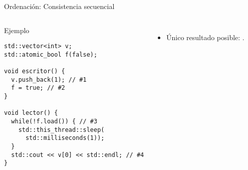 \begin{frame}[fragile]{Ordenación: Consistencia secuencial}
\begin{columns}[T]


\begin{block}{Ejemplo}
\begin{lstlisting}
std::vector<int> v; 
std::atomic_bool f(false); 

void escritor() { 
  v.push_back(1); // #1
  f = true; // #2
}

void lector() { 
  while(!f.load()) { // #3
    std::this_thread::sleep(
      std::milliseconds(1)); 
  }
  std::cout << v[0] << std::endl; // #4
} 
\end{lstlisting}
\end{block}




\begin{itemize}
  \item Único resultado posible: .
\end{itemize}
\end{columns}

\end{frame}

